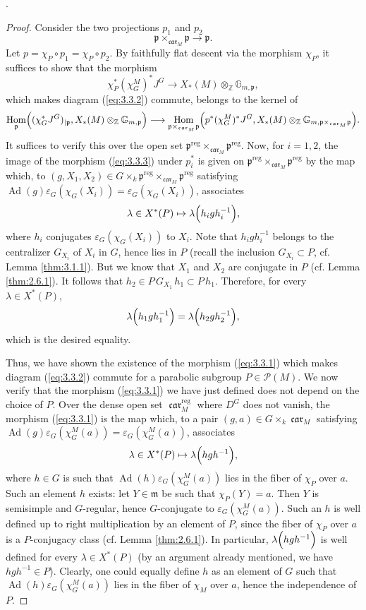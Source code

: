 \documentclass[12pt,a4paper,oneside,english,leqno]{smfart}
\makeatletter
\numberwithin{equation}{subsection}
\numberwithin{theo}{subsection}
\newenvironment{paragr}[1][]{\medskip\refstepcounter{subsection}%
  \par\noindent\hspace*{\parindent}\thesubsection.\ \emph{#1}%
  \@ifundefined{@empty}{}{}\ignorespaces}{\medskip}
\theoremstyle{plain}
\theoremstyle{definition}
\theoremstyle{remark}
\DeclareMathOperator{\reg}{reg}
\DeclareMathOperator{\Ad}{Ad}
\DeclareMathOperator{\Hom}{Hom}
\DeclareMathOperator{\car}{\mathfrak{car}}
\newcommand{\ZZ}{\mathbb{Z}}
\newcommand{\pc}{\mathcal{P}}
\newcommand{\mgo}{\mathfrak{m}}
\newcommand{\pgo}{\mathfrak{p}}
\newcommand{\eps}{\varepsilon}
\makeatother
\begin{document}
\begin{paragr}
\begin{proof}
Consider the two projections $p_1$ and $p_2$
$$ \pgo\times_{\car_M} \pgo \longrightarrow \pgo.$$
Let $p=\chi_P\circ p_1=\chi_P\circ p_2$. By faithfully flat descent via the morphism $\chi_P$, it suffices to show that the morphism
\begin{equation}\label{eq:3.3.3}
  \chi_P^*(\chi_G^M)^* J^G\to X_*(M)\otimes_{\ZZ} \mathbb{G}_{m,\pgo},
\end{equation}
which makes diagram (\ref{eq:3.3.2}) commute, belongs to the kernel of
$$\Hom_{\pgo}\Bigl( (\chi_G^* J^G)_{|\pgo},  X_*(M)\otimes_{\ZZ} \mathbb{G}_{m,\pgo}\Bigr)  \longrightarrow  \Hom_{\pgo\times_{\car_M} \pgo} \Bigl( p^* (\chi_G^M)^* J^G,  X_*(M)\otimes_{\ZZ} \mathbb{G}_{m,\pgo\times_{\car_M} \pgo}\Bigr).$$
It suffices to verify this over the open set $\pgo^{\reg}\times_{\car_M}\pgo^{\reg}$. Now, for $i=1,2$, the image of the morphism (\ref{eq:3.3.3}) under $p_i^*$ is given on $\pgo^{\reg}\times_{\car_M}\pgo^{\reg}$ by the map which, to $(g,X_1,X_2) \in G\times_k \pgo^{\reg}\times_{\car_M}\pgo^{\reg}$ satisfying $\Ad(g)\eps_G(\chi_G(X_i))=\eps_G(\chi_G(X_i))$, associates
$$\lambda\in X^*(P) \mapsto  \lambda\Bigl(h_i g h_i^{-1}\Bigr),$$
where $h_i$ conjugates $\eps_G(\chi_G(X_i))$ to $X_i$. Note that $h_i g h_i^{-1}$ belongs to the centralizer $G_{X_i}$ of $X_i$ in $G$, hence lies in $P$ (recall the inclusion $G_{X_i}\subset P$, cf. Lemma \ref{thm:3.1.1}). But we know that $X_1$ and $X_2$ are conjugate in $P$ (cf. Lemma \ref{thm:2.6.1}). It follows that $h_2\in P\,G_{X_1}\,h_1 \subset P\,h_1$. Therefore, for every $\lambda\in X^*(P)$,
$$ \lambda\Bigl(h_1 g h_1^{-1}\Bigr)=\lambda\Bigl(h_2 g h_2^{-1}\Bigr),$$
which is the desired equality.

Thus, we have shown the existence of the morphism (\ref{eq:3.3.1}) which makes diagram (\ref{eq:3.3.2}) commute for a parabolic subgroup $P\in\pc(M)$. We now verify that the morphism (\ref{eq:3.3.1}) we have just defined does not depend on the choice of $P$. Over the dense open set $\car_M^{\reg}$ where $D^G$ does not vanish, the morphism (\ref{eq:3.3.1}) is the map which, to a pair $(g,a)\in G\times_k \car_M$ satisfying $\Ad(g)\eps_G(\chi_G^M(a))=\eps_G(\chi_G^M(a))$, associates
$$\lambda\in X^*(P) \mapsto \lambda\Bigl(hgh^{-1}\Bigr),$$
where $h\in G$ is such that $\Ad(h)\eps_G(\chi_G^M(a))$ lies in the fiber of $\chi_P$ over $a$. Such an element $h$ exists: let $Y\in \mgo$ be such that $\chi_P(Y)=a$. Then $Y$ is semisimple and $G$-regular, hence $G$-conjugate to $\eps_G(\chi_G^M(a))$. Such an $h$ is well defined up to right multiplication by an element of $P$, since the fiber of $\chi_P$ over $a$ is a $P$-conjugacy class (cf. Lemma \ref{thm:2.6.1}). In particular, $\lambda\Bigl(hgh^{-1}\Bigr)$ is well defined for every $\lambda\in X^*(P)$ (by an argument already mentioned, we have $hgh^{-1}\in P$). Clearly, one could equally define $h$ as an element of $G$ such that $\Ad(h)\eps_G(\chi_G^M(a))$ lies in the fiber of $\chi_M$ over $a$, hence the independence of $P$.
\end{proof}
\end{paragr}
\end{document}
